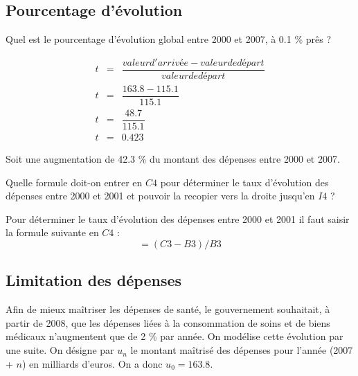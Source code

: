 \subsection{Pourcentage d'évolution}

\begin{questions}
	\question[1] Quel est le pourcentage d'évolution global entre 2000 et 2007, à \num{0.1} \% prês ? 
	\begin{solution}
		\begin{eqnarray*}
			t &=& \dfrac{valeur d'arrivée - valeur de départ}{valeur de départ} \\
			t &=& \dfrac{\num{163.8} - \num{115.1}}{\num{115.1}} \\
			t &=& \dfrac{\num{48.7}}{\num{115.1}} \\
			t &=& \num{0.423}
		\end{eqnarray*}
	
		Soit une augmentation de \num{42.3} \% du montant des dépenses entre 2000 et 2007.
	\end{solution}

	\question[1] Quelle formule doit-on entrer en $C4$ pour déterminer le taux d'évolution des dépenses entre 2000 et 2001 et pouvoir la recopier vers la droite jusqu'en $I4$ ?
	\begin{solution}
		Pour déterminer le taux d'évolution des dépenses entre 2000 et 2001 il faut saisir la formule suivante en $C4$  :
		\begin{equation*}
			= (C3 - B3) / B3
		\end{equation*}
	\end{solution}
\end{questions}

\subsection{Limitation des dépenses}

Afin de mieux maîtriser les dépenses de santé, le gouvernement souhaitait, à partir de 2008, que les dépenses liées à la consommation de soins et de biens médicaux n'augmentent que de 2 \% par année. On modélise cette évolution par une suite. On désigne par $u_n$ le montant maîtrisé des dépenses pour l'année (2007 + $n$) en milliards d'euros. On a donc $u_0 = \num{163.8}$.

